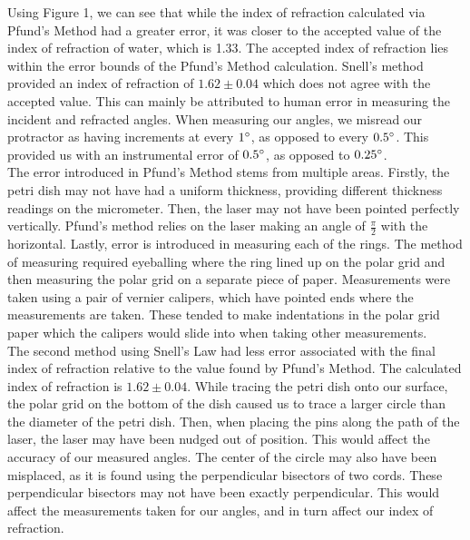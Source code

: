 Using Figure 1, we can see that while the index of refraction calculated via Pfund's Method had a greater error, it was closer to the accepted value of the index of refraction of water, which is 1.33. The accepted index of refraction lies within the error bounds of the Pfund's Method calculation. Snell's method provided an index of refraction of $1.62\pm0.04$ which does not agree with the accepted value. This can mainly be attributed to human error in measuring the incident and refracted angles. When measuring our angles, we misread our protractor as having increments at every $1\degree$, as opposed to every $0.5\degree$. This provided us with an instrumental error of $0.5\degree$, as opposed to $0.25\degree$.
\\\indent The error introduced in Pfund's Method stems from multiple areas. Firstly, the petri dish may not have had a uniform thickness, providing different thickness readings on the micrometer. Then, the laser may not have been pointed perfectly vertically. Pfund's method relies on the laser making an angle of $\frac{\pi}{2}$ with the horizontal. Lastly, error is introduced in measuring each of the rings. The method of measuring required eyeballing where the ring lined up on the polar grid and then measuring the polar grid on a separate piece of paper. Measurements were taken using a pair of vernier calipers, which have pointed ends where the measurements are taken. These tended to make indentations in the polar grid paper which the calipers would slide into when taking other measurements.\\
\indent The second method using Snell's Law had less error associated with the final index of refraction relative to the value found by Pfund's Method. The calculated index of refraction is $1.62\pm0.04$. While tracing the petri dish onto our surface, the polar grid on the bottom of the dish caused us to trace a larger circle than the diameter of the petri dish. Then, when placing the pins along the path of the laser, the laser may have been nudged out of position. This would affect the accuracy of our measured angles. The center of the circle may also have been misplaced, as it is found using the perpendicular bisectors of two cords. These perpendicular bisectors may not have been exactly perpendicular. This would affect the measurements taken for our angles, and in turn affect our index of refraction.